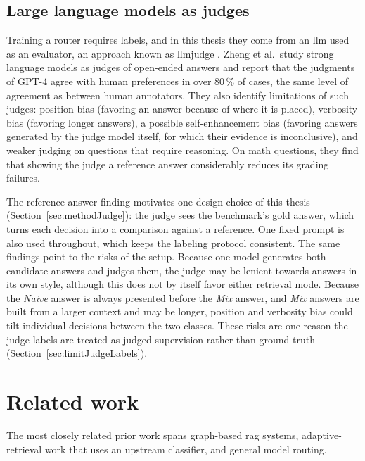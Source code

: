 \documentclass[english, bibtex]{kththesis}               %
\numberwithin{listing}{chapter}
\providecommand{\DIFaddtex}[1]{{\protect\color{blue} \sf #1}} %
\providecommand{\DIFaddbegin}{} %
\providecommand{\DIFaddend}{} %
\providecommand{\DIFadd}[1]{\texorpdfstring{\DIFaddtex{#1}}{#1}} %
\begin{document}
\DIFaddbegin \subsection{\DIFadd{Large language models as judges}}
\label{sec:backgroundJudge}

\DIFadd{Training a router requires labels, and in this thesis they come from an \gls{llm} used as an evaluator, an approach known as \gls{llmjudge} \cite{zheng2023judge}. Zheng et al.\ study strong language models as judges of open-ended answers and report that the judgments of GPT-4 agree with human preferences in over 80\,\% of cases, the same level of agreement as between human annotators. They also identify limitations of such judges: position bias (favoring an answer because of where it is placed), verbosity bias (favoring longer answers), a possible self-enhancement bias (favoring answers generated by the judge model itself, for which their evidence is inconclusive), and weaker judging on questions that require reasoning. On math questions, they find that showing the judge a reference answer considerably reduces its grading failures.
}

\DIFadd{The reference-answer finding motivates one design choice of this thesis (Section~\ref{sec:methodJudge}): the judge sees the benchmark's gold answer, which turns each decision into a comparison against a reference. One fixed prompt is also used throughout, which keeps the labeling protocol consistent. The same findings point to the risks of the setup. Because one model generates both candidate answers and judges them, the judge may be lenient towards answers in its own style, although this does not by itself favor either retrieval mode. Because the \emph{Naive} answer is always presented before the \emph{Mix} answer, and \emph{Mix} answers are built from a larger context and may be longer, position and verbosity bias could tilt individual decisions between the two classes. These risks are one reason the judge labels are treated as judged supervision rather than ground truth (Section~\ref{sec:limitJudgeLabels}).
}

\DIFaddend \section{Related work}
\label{sec:relatedWork}

The most closely related prior work spans graph-based \gls{rag} systems, adaptive-retrieval work that uses an upstream classifier, and general model routing.
\end{document}
